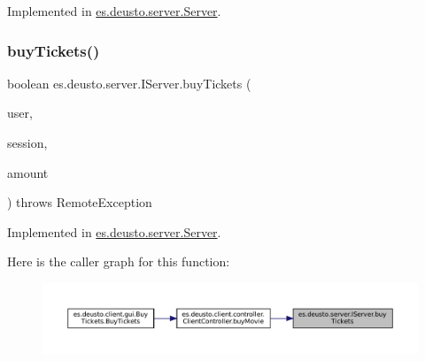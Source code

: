 Implemented in \mbox{\hyperlink{classes_1_1deusto_1_1server_1_1_server_abca83b4649011a8a68af754bbd25e22d}{es.\+deusto.\+server.\+Server}}.

\mbox{\label{interfacees_1_1deusto_1_1server_1_1_i_server_ac3302c01fefc37a32c0bcbf79fcce44b}} 
\subsubsection{\texorpdfstring{buyTickets()}{buyTickets()}}
{\footnotesize\ttfamily boolean es.\+deusto.\+server.\+I\+Server.\+buy\+Tickets (\begin{DoxyParamCaption}\item[{\mbox{\hyperlink{classes_1_1deusto_1_1server_1_1data_1_1_user_d_t_o}{User\+D\+TO}}}]{user,  }\item[{\mbox{\hyperlink{classes_1_1deusto_1_1server_1_1data_1_1_session_d_t_o}{Session\+D\+TO}}}]{session,  }\item[{int}]{amount }\end{DoxyParamCaption}) throws Remote\+Exception}



Implemented in \mbox{\hyperlink{classes_1_1deusto_1_1server_1_1_server_a3bbf9f19774d2fae5c831cfac1f2306c}{es.\+deusto.\+server.\+Server}}.

Here is the caller graph for this function\+:
\nopagebreak
\begin{figure}[H]
\begin{center}
\leavevmode
\includegraphics[width=350pt]{interfacees_1_1deusto_1_1server_1_1_i_server_ac3302c01fefc37a32c0bcbf79fcce44b_icgraph}
\end{center}
\end{figure}
\mbox{\label{interfacees_1_1deusto_1_1server_1_1_i_server_a0b3243dc04d49f7659fefec4e4fb43b7}} 
